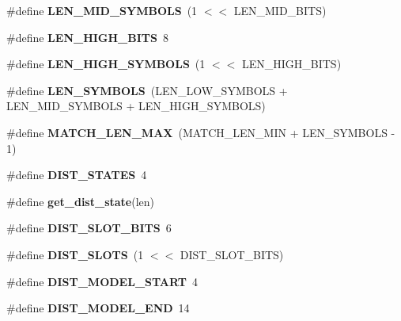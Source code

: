 \begin{DoxyCompactItemize}
\item 
\#define {\bfseries L\-E\-N\-\_\-\-M\-I\-D\-\_\-\-S\-Y\-M\-B\-O\-L\-S}~(1 $<$$<$ L\-E\-N\-\_\-\-M\-I\-D\-\_\-\-B\-I\-T\-S)\label{lzma__common_8h_a41b4c58d4c4c3bfe41a7b73329e581d0}

\item 
\#define {\bfseries L\-E\-N\-\_\-\-H\-I\-G\-H\-\_\-\-B\-I\-T\-S}~8\label{lzma__common_8h_ae09b9993a1717f3f867dc50e8f07665a}

\item 
\#define {\bfseries L\-E\-N\-\_\-\-H\-I\-G\-H\-\_\-\-S\-Y\-M\-B\-O\-L\-S}~(1 $<$$<$ L\-E\-N\-\_\-\-H\-I\-G\-H\-\_\-\-B\-I\-T\-S)\label{lzma__common_8h_aaae9f1f1f03f4a686f03d127d8df4b83}

\item 
\#define {\bfseries L\-E\-N\-\_\-\-S\-Y\-M\-B\-O\-L\-S}~(L\-E\-N\-\_\-\-L\-O\-W\-\_\-\-S\-Y\-M\-B\-O\-L\-S + L\-E\-N\-\_\-\-M\-I\-D\-\_\-\-S\-Y\-M\-B\-O\-L\-S + L\-E\-N\-\_\-\-H\-I\-G\-H\-\_\-\-S\-Y\-M\-B\-O\-L\-S)\label{lzma__common_8h_a07c07c3a78ddd32b8688a98be11fcb3d}

\item 
\#define {\bfseries M\-A\-T\-C\-H\-\_\-\-L\-E\-N\-\_\-\-M\-A\-X}~(M\-A\-T\-C\-H\-\_\-\-L\-E\-N\-\_\-\-M\-I\-N + L\-E\-N\-\_\-\-S\-Y\-M\-B\-O\-L\-S -\/ 1)\label{lzma__common_8h_a035b46ae64c71e0a6a2cbadb2919e95c}

\item 
\#define {\bfseries D\-I\-S\-T\-\_\-\-S\-T\-A\-T\-E\-S}~4\label{lzma__common_8h_a3afda544104deb6878935b33cb3fb027}

\item 
\#define {\bfseries get\-\_\-dist\-\_\-state}(len)
\item 
\#define {\bfseries D\-I\-S\-T\-\_\-\-S\-L\-O\-T\-\_\-\-B\-I\-T\-S}~6\label{lzma__common_8h_a36b6c4eaec443dc813e12e1aaadfb97c}

\item 
\#define {\bfseries D\-I\-S\-T\-\_\-\-S\-L\-O\-T\-S}~(1 $<$$<$ D\-I\-S\-T\-\_\-\-S\-L\-O\-T\-\_\-\-B\-I\-T\-S)\label{lzma__common_8h_a903523e973d201db2ab82a5284b0b40f}

\item 
\#define {\bfseries D\-I\-S\-T\-\_\-\-M\-O\-D\-E\-L\-\_\-\-S\-T\-A\-R\-T}~4\label{lzma__common_8h_ae5011f8df31787b3fab5dab429f1f7ff}

\item 
\#define {\bfseries D\-I\-S\-T\-\_\-\-M\-O\-D\-E\-L\-\_\-\-E\-N\-D}~14\label{lzma__common_8h_aa61c0222da66043346632577d364896c}


\end{DoxyCompactItemize}
